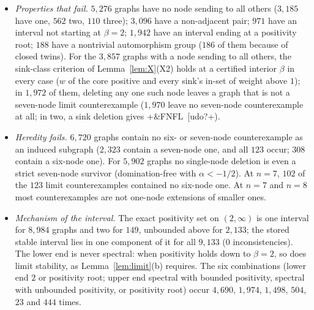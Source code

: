 \documentclass[11pt]{article}
\theoremstyle{definition}
\begin{document}
{\begin{itemize}
census found $15$, $169$, $3{,}040$, $34{,}521$ and $48{,}108$ distinct induced subgraphs on $3,\dots,7$ nodes); a node that
receives from all others also sends to all others (proved; $131$ graphs are joins $H\vee K_1$ or $H\vee K_2$); no two
non-adjacent nodes are in-twins (Lemma~\ref{lem:twin}). None of these singles out counterexamples: the $338{,}505$ strict
survivors of stages 2--4 that are \emph{not} limit counterexamples satisfy all of them, except that $18$ of them are not
strongly connected (all $18$ fail positivity). What separates the $9{,}133$ is the joint condition, positivity and
$\alpha<-\gamma$ at a common $\beta$, and no graph-local feature we tested captures it.
\item \emph{Properties that fail.} $5{,}276$ graphs have no node sending to all others ($3{,}185$ have one, $562$ two, $110$
three); $3{,}096$ have a non-adjacent pair; $971$ have an interval not starting at $\beta=2$; $1{,}942$ have an interval ending
at a positivity root; $188$ have a nontrivial automorphism group ($186$ of them because of closed twins). For the $3{,}857$
graphs with a node sending to all others, the sink-class criterion of Lemma~\ref{lem:X}(X2) holds at a certified interior
$\beta$ in every case ($w$ of the core positive and every sink's in-set of weight above $1$); in $1{,}972$ of them, deleting any
one such node leaves a graph that is not a seven-node limit counterexample ($1{,}970$ leave no seven-node counterexample at all; in two, a sink deletion gives \dsix+&FNFL~[udo?+).
\item \emph{Heredity fails.} $6{,}720$ graphs contain no six- or seven-node counterexample as an induced subgraph ($2{,}323$
contain a seven-node one, and all $123$ occur; $308$ contain a six-node one). For $5{,}902$ graphs no single-node deletion
is even a strict seven-node survivor (domination-free with $\alpha<-1/2$). At $n=7$, $102$ of the $123$ limit counterexamples
contained no six-node one. At $n=7$ and $n=8$ most counterexamples are not one-node extensions of smaller ones.
\item \emph{Mechanism of the interval.} The exact positivity set on $(2,\infty)$ is one interval for $8{,}984$ graphs and two
for $149$, unbounded above for $2{,}133$; the stored stable interval lies in one component of it for all $9{,}133$ ($0$
inconsistencies). The lower end is never spectral: when positivity holds down to $\beta=2$, so does limit stability, as
Lemma~\ref{lem:limit}(b) requires. The six combinations (lower end $2$ or positivity root; upper end spectral with bounded
positivity, spectral with unbounded positivity, or positivity root) occur $4{,}690$, $1{,}974$, $1{,}498$, $504$, $23$ and
$444$ times.
\end{itemize}

}
\end{document}
